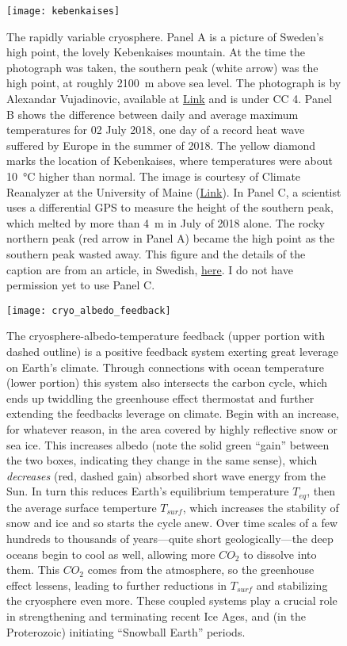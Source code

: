 \documentclass[amstex,12pt]{book}
\begin{document}
\begin{figure}[p]
\centering
\texttt{[image: kebenkaises]}%
\caption{The rapidly variable cryosphere. Panel A is a picture of Sweden's high point, the lovely Kebenkaises mountain. At the time the photograph was taken, the southern peak (white arrow) was the high point, at roughly \SI{2100}{\metre} above sea level. The photograph is by Alexandar Vujadinovic, available at \href{https://upload.wikimedia.org/wikipedia/commons/thumb/4/45/Kebnekaise_viewed_from_Tarfala_valley_-_narrower_crop.jpg/1024px-Kebnekaise_viewed_from_Tarfala_valley_-_narrower_crop.jpg}{Link} and is under CC 4. Panel B shows the difference between daily and average maximum temperatures for 02 July 2018, one day of a record heat wave suffered by Europe in the summer of 2018. The yellow diamond marks the location of Kebenkaises, where temperatures were about \SI{10}{\celsius} higher than normal. The image is courtesy of Climate Reanalyzer at the University of Maine (\href{https://climatereanalyzer.org/reanalysis/daily_maps/}{Link}). In Panel C, a scientist uses a differential GPS to measure the height of the southern peak, which melted by more than \SI{4}{\metre} in July of 2018 alone. The rocky northern peak (red arrow in Panel A) became the high point as the southern peak wasted away. This figure and the details of the caption are from an article, in Swedish, \href{http://www.mynewsdesk.com/se/su/pressreleases/kebnekaises-sydtopp-blir-laegre-aen-nordtoppen-i-augusti-2611533}{here}. I do not have permission yet to use Panel C.} 
\label{fig:kebenkaises}
\end{figure} 


\begin{figure}[p]
\centering
\texttt{[image: cryo\_albedo\_feedback]}%
\caption{The cryosphere-albedo-temperature feedback (upper portion with dashed outline) is a positive feedback system exerting great leverage on Earth's climate. Through connections with ocean temperature (lower portion) this system also intersects the carbon cycle, which ends up twiddling the greenhouse effect thermostat and further extending the feedbacks leverage on climate. Begin with an increase, for whatever reason, in the area covered by highly reflective snow or sea ice. This increases albedo (note the solid green ``gain'' between the two boxes, indicating they change in the same sense), which \emph{decreases} (red, dashed gain) absorbed short wave energy from the Sun. In turn this reduces Earth's equilibrium temperature $T_{eq}$, then the average surface temperture $T_{surf}$, which increases the stability of snow and ice and so starts the cycle anew. Over time scales of a few hundreds to thousands of years---quite short geologically---the deep oceans begin to cool as well, allowing more $CO_2$ to dissolve into them. This $CO_2$ comes from the atmosphere, so the greenhouse effect lessens, leading to further reductions in $T_{surf}$ and stabilizing the cryosphere even more. These coupled systems play a crucial role in strengthening and terminating recent Ice Ages, and (in the Proterozoic) initiating ``Snowball Earth'' periods.} 
\label{fig:cryo_albedo_feedback}
\end{figure}
\end{document}
